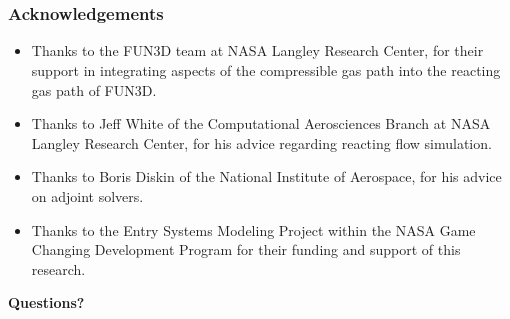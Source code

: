 \documentclass{beamer}
\begin{document}
\section{}


\begin{frame}
  \frametitle{Acknowledgements}
  \begin{itemize}
   \item Thanks to the FUN3D team at NASA Langley Research Center, for their
     support in integrating aspects of the compressible gas path into the
     reacting gas path of FUN3D.
   \item Thanks to Jeff White of the Computational Aerosciences Branch at NASA
     Langley Research Center, for his advice regarding reacting flow simulation.
   \item Thanks to Boris Diskin of the National Institute of Aerospace, for his
     advice on adjoint solvers.
   \item Thanks to the Entry Systems Modeling Project within the NASA
     Game Changing Development Program for their funding and support of this research.  
  \end{itemize}
\end{frame}
\begin{frame}
  \huge
  \centering
  {\bf Questions?}
\end{frame}
\end{document}
